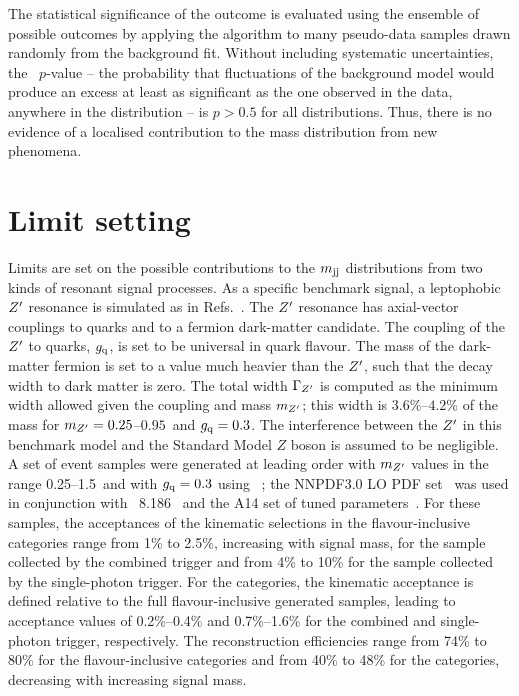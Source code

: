 The statistical significance of the outcome is evaluated using the ensemble of possible outcomes by applying the algorithm to many pseudo-data samples drawn randomly from the background fit.
Without including systematic uncertainties, the \BumpHunter\ $p$-value -- the probability that fluctuations of the background model would produce an excess at least as significant as the one observed in the data, anywhere in the distribution -- is $p > 0.5$ for all distributions.
Thus, there is no evidence of a localised contribution to the mass distribution from new phenomena.

\section{Limit setting}
\label{sec:dijetlimits}

Limits are set on the possible contributions to the $m_{\textrm{jj}}$ distributions from two kinds of resonant signal processes.
As a specific benchmark signal, a leptophobic $Z^{\prime}$ resonance is simulated as in Refs.~\cite{LHCDMF:2015,EXOT-2015-02}.
The $Z^{\prime}$ resonance has axial-vector couplings to quarks and to a fermion dark-matter candidate.
The coupling of the $Z^{\prime}$ to quarks, $g_{\textrm{q}}$, is set to be universal in quark flavour.
The mass of the dark-matter fermion is set to a value much heavier than the $Z^{\prime}$, such that the decay width to dark matter is zero.
The total width $\Gamma_{Z^{\prime}}$ is computed as the minimum width allowed given the coupling and mass $m_{Z^{\prime}}$; this width is $3.6\%$--$4.2\%$ of the mass for $m_{Z^{\prime}}=0.25$--$0.95$~\TeV and $g_{\textrm{q}}=0.3$. 
The interference between the $Z^{\prime}$ in this benchmark model and the Standard Model $Z$ boson is assumed to be negligible.
A set of event samples were generated at leading order with $m_{Z^{\prime}}$ values in the range 0.25--1.5~\TeV and with $g_{\textrm{q}}=0.3$ using ~\cite{Alwall:2014hca}; the \textsc{NNPDF3.0 LO} PDF set~\cite{Ball:2012cx} was used in conjunction with \PYTHIA~8.186~\cite{Sjostrand:2007gs} and the \textsc{A14} set of tuned parameters~\cite{ATL-PHYS-PUB-2014-021}.
For these samples, the acceptances of the kinematic selections in the flavour-inclusive categories range from 1\% to 2.5\%, increasing with signal mass, for the sample collected by the combined trigger and from 4\% to 10\% for the sample collected by the single-photon trigger. 
For the \btagged categories, the kinematic acceptance is defined relative to the full flavour-inclusive generated samples, leading to acceptance values of 0.2\%--0.4\% and 0.7\%--1.6\% for the combined and single-photon trigger, respectively. 
The reconstruction efficiencies range from 74\% to 80\% for the flavour-inclusive categories and from 40\% to 48\% for the \btagged categories, decreasing with increasing signal mass.

